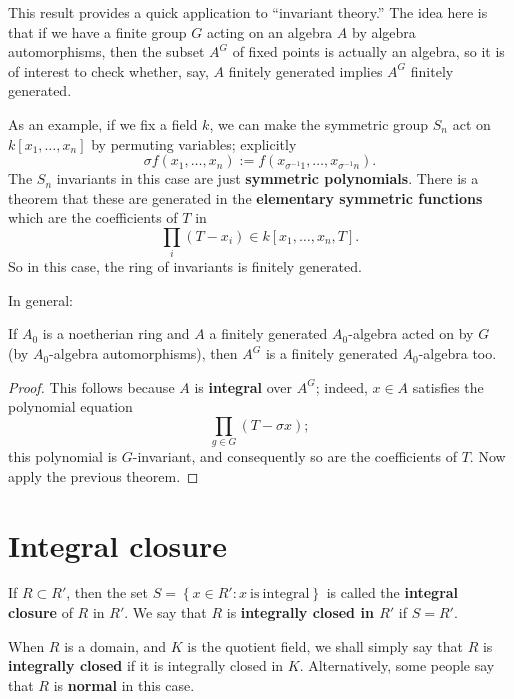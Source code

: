 This result provides a quick application to ``invariant theory.''  The idea
here is that if we have a finite group $G$  acting
on an algebra $A$ by algebra automorphisms, then the subset $A^G$ of fixed
points is actually an algebra, so it is  of interest to check whether, say,
$A$ finitely generated implies $A^G$ finitely generated.

\begin{example} 
As an example, if we fix a field $k$, we can make the symmetric group $S_n$
act on $k[x_1, \dots, x_n]$ by permuting variables; explicitly
\[ \sigma f(x_1, \dots, x_n) := f( x_{\sigma^{-1} 1}, \dots,
x_{\sigma^{-1}n}).\]
The $S_n$ invariants in this case are just \textbf{symmetric polynomials}.
There is a theorem that these are generated in the \textbf{elementary
symmetric functions} which are the coefficients of $T$ in
\[ \prod_i (T - x_i)  \in k[x_1, \dots, x_n, T].\]
So in this case, the ring of invariants is finitely generated.

\end{example} 

In general:
\begin{corollary} If $A_0$ is a noetherian ring and $A$ a finitely generated
$A_0$-algebra acted on by $G$ (by $A_0$-algebra automorphisms), then $A^G$
is a finitely generated $A_0$-algebra too.
\end{corollary}
\begin{proof} 
This follows because $A$ is \textbf{integral} over $A^G$; indeed, $x \in A$
satisfies the polynomial equation
\[ \prod_{g \in G} (T - \sigma x);\]
this polynomial is $G$-invariant, and consequently so are the coefficients
of $T$.
Now apply the previous theorem.

\end{proof} 




\section{Integral closure}
\begin{definition}
If $R \subset R'$, then the set $S = \left\{x \in R': x \ \mathrm{is \
integral  }\right\}$ is called the \textbf{integral closure} of $R$ in $R'$. We
say that $R$ is \textbf{integrally closed in $R'$} if $S = R'$.


When $R$ is a domain, and $K$ is the quotient field,  we shall simply
say that $R$ is \textbf{integrally closed} if it is integrally closed in
$K$.
Alternatively, some people say that $R$ is \textbf{normal} in this case.
\end{definition}

